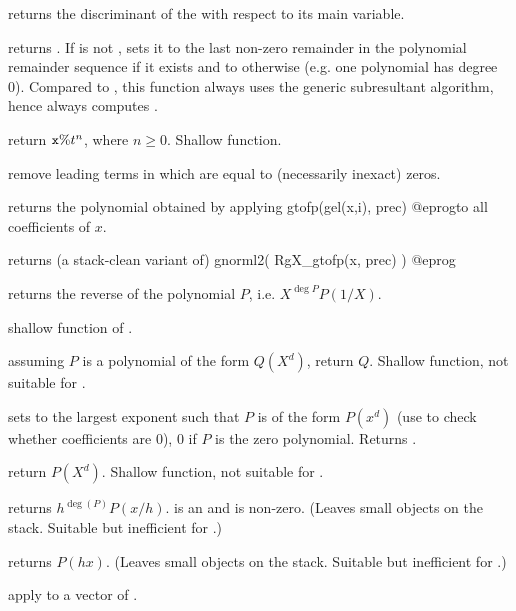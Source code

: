  returns the discriminant of the  
with respect to its main variable.

 returns
. If  is not , sets it to the last
non-zero remainder in the polynomial remainder sequence if it exists and to
 otherwise (e.g. one polynomial has degree 0). Compared to
, this function always uses the generic subresultant
algorithm, hence always computes .

 return ${\tt x \% } t^n$,
where $n\geq 0$. Shallow function.

 remove leading terms in  which are
equal to (necessarily inexact) zeros.

 returns the polynomial obtained by
applying
\bprog
  gtofp(gel(x,i), prec)
@eprog\noindent to all coefficients of $x$.

 returns (a stack-clean variant of)
\bprog
  gnorml2( RgX_gtofp(x, prec) )
@eprog

 returns the reverse of the polynomial
$P$, i.e. $X^{\deg P} P(1/X)$.

 shallow function of .

 assuming $P$ is a polynomial of the
form $Q(X^d)$, return $Q$. Shallow function, not suitable for
.

 sets  to the largest exponent
such that $P$ is of the form $P(x^d)$ (use  to check
whether coefficients are 0), $0$ if $P$ is the zero polynomial. Returns
.

 return $P(X^d)$. Shallow function, not
suitable for .

 returns $h^{\deg(P)} P(x/h)$.
 is an  and  is non-zero. (Leaves small objects on the
stack. Suitable but inefficient for .)

 returns $P(h x)$. (Leaves small objects
on the stack. Suitable but inefficient for .)

 apply  to a vector
of .

